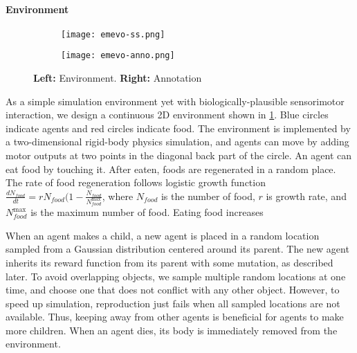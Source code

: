 \paragraph{Environment}

\begin{figure}[t]
  \begin{subfigure}[t]{6cm}
    \centering
    \texttt{[image: emevo-ss.png]}
  \end{subfigure}
  \begin{subfigure}[t]{8cm}
    \centering
    \texttt{[image: emevo-anno.png]}
  \end{subfigure}
  \caption{
    \textbf{Left:} Environment.
    \textbf{Right:} Annotation
  }\label{figure:env}
\end{figure}

As a simple simulation environment yet with biologically-plausible sensorimotor interaction, we design a continuous 2D environment shown in \cref{figure:env}. Blue circles indicate agents and red circles indicate food. The environment is implemented by a two-dimensional rigid-body physics simulation, and agents can move by adding motor outputs at two points in the diagonal back part of the circle. An agent can eat food by touching it. After eaten, foods are regenerated in a random place. The rate of food regeneration follows logistic growth function $\frac{dN_{food}}{dt} = r N_{food} (1 - \frac{N_{food}}{N_{food}^{\mathrm{max}}}$, where $N_{food}$ is the number of food, $r$ is growth rate, and $N_{food}^{\mathrm{max}}$ is the maximum number of food. Eating food increases

When an agent makes a child, a new agent is placed in a random location sampled from a Gaussian distribution centered around its parent. The new agent inherits its reward function from its parent with some mutation, as described later. To avoid overlapping objects, we sample multiple random locations at one time, and choose one that does not conflict with any other object. However, to speed up simulation, reproduction just fails when all sampled locations are not available. Thus, keeping away from other agents is beneficial for agents to make more children. When an agent dies, its body is immediately removed from the environment.

